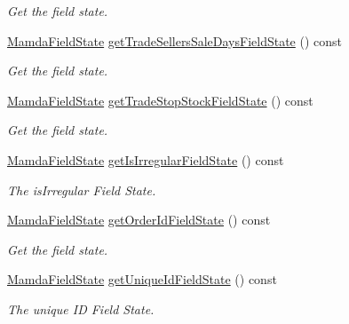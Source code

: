 \begin{CompactItemize}
\begin{CompactList}\small\item\em Get the field state. \item\end{CompactList}\item 
\hyperlink{namespaceWombat_93aac974f2ab713554fd12a1fa3b7d2a}{Mamda\-Field\-State} \hyperlink{classWombat_1_1MamdaTradeListener_2090b9605a4191bf78b5cef58c7e1fbe}{get\-Trade\-Sellers\-Sale\-Days\-Field\-State} () const 
\begin{CompactList}\small\item\em Get the field state. \item\end{CompactList}\item 
\hyperlink{namespaceWombat_93aac974f2ab713554fd12a1fa3b7d2a}{Mamda\-Field\-State} \hyperlink{classWombat_1_1MamdaTradeListener_ba6a73453e3956f883f40b5ae7d127d0}{get\-Trade\-Stop\-Stock\-Field\-State} () const 
\begin{CompactList}\small\item\em Get the field state. \item\end{CompactList}\item 
\hyperlink{namespaceWombat_93aac974f2ab713554fd12a1fa3b7d2a}{Mamda\-Field\-State} \hyperlink{classWombat_1_1MamdaTradeListener_f8e874c8dc039fb83f1e9f4a8bdcbc6f}{get\-Is\-Irregular\-Field\-State} () const 
\begin{CompactList}\small\item\em The is\-Irregular Field State. \item\end{CompactList}\item 
\hyperlink{namespaceWombat_93aac974f2ab713554fd12a1fa3b7d2a}{Mamda\-Field\-State} \hyperlink{classWombat_1_1MamdaTradeListener_f0f77145439c12c8bae3640307b50401}{get\-Order\-Id\-Field\-State} () const 
\begin{CompactList}\small\item\em Get the field state. \item\end{CompactList}\item 
\hyperlink{namespaceWombat_93aac974f2ab713554fd12a1fa3b7d2a}{Mamda\-Field\-State} \hyperlink{classWombat_1_1MamdaTradeListener_b0093f9dcf1bb03c17beb2915518a179}{get\-Unique\-Id\-Field\-State} () const 
\begin{CompactList}\small\item\em The unique ID Field State. \item\end{CompactList}\item 

\end{CompactItemize}
